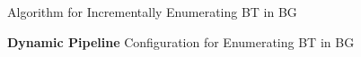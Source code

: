 \begin{frame}[fragile]{Algorithm for Incrementally Enumerating BT in BG}
  \begin{center}
    \textbf{Dynamic Pipeline} Configuration for Enumerating BT in BG
  \end{center}    
  \begin{figure}
    \centering  
  \end{figure}
  \begin{figure}
    \centering  
  \end{figure}
\end{frame}


